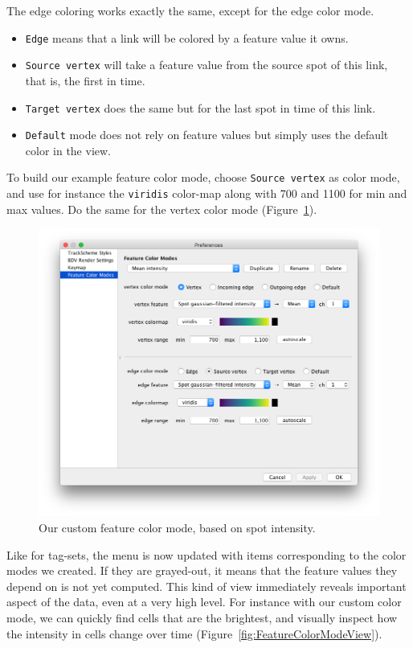 The edge coloring works exactly the same, except for the edge color mode.
\begin{itemize}
    \item \texttt{Edge} means that a link will be colored by a feature value it owns.
    \item \texttt{Source vertex} will take a feature value from the source spot of this link, that is, the first in time.
    \item \texttt{Target vertex} does the same but for the last spot in time of this link. 
    \item \texttt{Default} mode does not rely on feature values but simply uses the default color in the view.
\end{itemize}
\noindent To build our example feature color mode, choose \texttt{Source vertex} as color mode, and use for instance the \texttt{viridis} color-map along with 700 and 1100 for min and max values.
Do the same for the vertex color mode (Figure~\ref{fig:FeatureColorModeConfig2}).


\begin{figure}
    \centering
    \includegraphics[height=0.3\textheight]{figures/Mastodon_FeatureColorModeConfig_2.png}
    
    \caption{Our custom feature color mode, based on spot intensity. }
    \label{fig:FeatureColorModeConfig2}
\end{figure}

Like for tag-sets, the  menu is now updated with items corresponding to the color modes we created.
If they are grayed-out, it means that the feature values they depend on is not yet computed.
This kind of view immediately reveals important aspect of the data, even at a very high level.
For instance with our custom color mode, we can quickly find cells that are the brightest, and visually inspect how the intensity in cells change over time (Figure~\ref{fig:FeatureColorModeView}).

